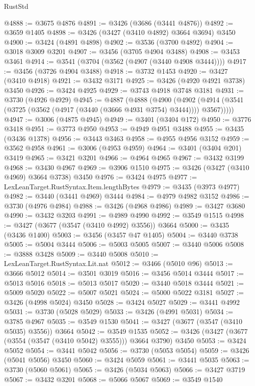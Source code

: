 \begin{lexlean}{RustStd}
\begin{coremodule}
@4888 := @3675 @4876
@4891 := @3426 (@3686 (@3441 @4876))
@4892 := @3659 @1405
@4898 := @3426 (@3427 (@3410 @4892) @3664 @3694) @3450
@4900 := @3424 (@4891 @4898)
@4902 := @3536 (@3700 @4892)
@4904 := @3018 @3009 @3201
@4907 := @3456 (@3705 @4904 @3488)
@4908 := @3453 @3461
@4914 := @3541 (@3704 (@3562 (@4907 (@3440 @4908 @3444))))
@4917 := @3456 (@3726 @4904 @3488)
@4918 := @3732 @1453
@4920 := @3427 (@3410 @4918)
@4921 := @3432 @3171
@4925 := @3426 (@4920 @4921 @3738) @3450
@4926 := @3424 @4925
@4929 := @3743 @4918 @3748 @3181
@4931 := @3730 (@4926 @4929)
@4945 := @4887
    (@4888
      (@4900
        (@4902 (@4914 (@3541 (@3725 (@3562 (@4917 (@3440 (@3666 @4931 @3754) @3444)))) @3567)))))
@4947 := @3006 (@4875 @4945)
@4949 := @3401 (@3404 @172)
@4950 := @3776 @3418
@4951 := @3773 @4950
@4953 := @4949 @4951 @3488
@4955 := @3435 (@3436 @1378)
@4956 := @3443 @3463
@4958 := @4955 @4956 @3152
@4959 := @3562 @4958
@4961 := @3006 (@4953 @4959)
@4964 := @3401 (@3404 @201) @3419
@4965 := @3421 @3201
@4966 := @4964 @4965
@4967 := @3432 @3199
@4968 := @3430 @4967
@4969 := @3906 @1510
@4975 := @3426 (@3427 (@3410 @4969) @3664 @3738) @3450
@4976 := @3424 @4975
@4977 := LexLeanTarget.RustSyntax.Item.lengthBytes
@4979 := @3435 (@3973 @4977)
@4982 := @3440 (@3441 @4969) @3444
@4984 := @4979 @4982 @3152
@4986 := @3730 (@4976 @4984)
@4988 := @3426 (@4968 @4986)
@4989 := @3427 @3680
@4990 := @3432 @3203
@4991 := @4989 @4990
@4992 := @3549 @1515
@4998 := @3427 (@3677 (@3547 (@3410 @4992) @3556)) @3664
@5000 := @3435 (@3436 @1400)
@5003 := @3456 (@3457 @47 @1405)
@5004 := @3440 @3738
@5005 := @5004 @3444
@5006 := @5003 @5005
@5007 := @3440 @5006
@5008 := @3888 @3428
@5009 := @3440 @5008
@5010 := LexLeanTarget.RustSyntax.Lit.nat
@5012 := @3466 (@5010 @96)
@5013 := @3666 @5012
@5014 := @3501 @3019
@5016 := @3456 @5014 @3444
@5017 := @5013 @5016
@5018 := @5013 @5017
@5020 := @3440 @5018 @3444
@5021 := @5009 @5020
@5022 := @5007 @5021
@5024 := @5000 @5022 @3181
@5027 := @3426 (@4998 @5024) @3450
@5028 := @3424 @5027
@5029 := @3441 @4992
@5031 := @3730 (@5028 @5029)
@5033 := @3426 (@4991 @5031)
@5034 := @3785 @4967
@5035 := @3549 @1530
@5041 := @3427 (@3677 (@3547 (@3410 @5035) @3556)) @3664
@5042 := @3549 @1535
@5052 := @3426 (@3427 (@3677 (@3554 (@3547 (@3410 @5042) @3555))) @3664 @3790) @3450
@5053 := @3424 @5052
@5054 := @3441 @5042
@5056 := @3730 (@5053 @5054)
@5059 := @3426 (@5041 @5056) @3450
@5060 := @3424 @5059
@5061 := @3441 @5035
@5063 := @3730 (@5060 @5061)
@5065 := @3426 (@5034 @5063)
@5066 := @3427 @3719
@5067 := @3432 @3201
@5068 := @5066 @5067
@5069 := @3549 @1540

\end{coremodule}
\end{lexlean}
